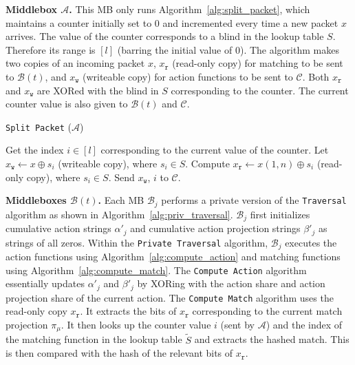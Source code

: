 \RequirePackage{fix-cm} \let\oldvec\vec \documentclass{sig-alternate-05-2015}
\newcommand{\descr}[1]{\smallskip \noindent \textbf{#1}}
\newcommand{\EMB}{\ensuremath{\mbox{$\mathcal{A}$}}}
\newcommand{\CMB}{\ensuremath{\mbox{$\mathcal{B}$}}}
\newcommand{\TMB}{\ensuremath{\mbox{$\mathcal{C}$}}}
\begin{document}
\descr{Middlebox \texorpdfstring{$\EMB$}{A)}.} 
This MB only runs Algorithm~\ref{alg:split_packet}, which maintains a counter initially set to $0$ and incremented every time a new packet $x$ arrives. The value of the counter corresponds to a blind in the lookup table $S$. Therefore its range is $[l]$ (barring the initial value of $0$). The algorithm makes two copies of an incoming packet $x$, $x_\mathtt{r}$ (read-only copy) for matching to be sent to $\CMB(t)$, and ${x}_\mathtt{w}$ (writeable copy) for action functions to be sent to $\TMB$. Both $x_\mathtt{r}$ and $x_\mathtt{w}$ are XORed with the blind in $S$ corresponding to the counter. The current counter value is also given to $\CMB(t)$ and $\TMB$. 

\begin{algorithm}[t] \caption{\texttt{Split Packet} ($\EMB$)}
\label{alg:split_packet}
\SetAlgoLined
{}
\SetAlCapSkip{1em}
\DontPrintSemicolon{}
\let\oldnl\nl \newcommand{\nonl}{\renewcommand{\nl}{\let\nl\oldnl}}
Get the index $i \in [l]$ corresponding to the current value of the counter.\;
Let $x_{\mathtt{w}} \leftarrow x \oplus s_i$ (writeable copy), where $s_i\in S$.\;
Compute $x_\mathtt{r} \leftarrow x(1, n) \oplus s_i$ (read-only copy), where $s_i \in S$. \;
\For{$j = 1$ \KwTo $t$}{
	Send $x_\mathtt{r}$, $i$ to $\CMB_j$.\;
}
Send $x_\mathtt{w}$, $i$ to $\TMB$.\;
\end{algorithm}

\descr{Middleboxes \texorpdfstring{$\CMB(t)$}{B(t)}.}
Each MB $\CMB_j$ performs a private version of the \texttt{Traversal} algorithm as shown in Algorithm~\ref{alg:priv_traversal}. $\CMB_j$ first initializes cumulative action strings $\alpha'_j$ and cumulative action projection strings $\beta'_j$ as strings of all zeros. Within the \texttt{Private Traversal} algorithm, $\CMB_j$ executes the action functions using Algorithm~\ref{alg:compute_action} and matching functions using Algorithm~\ref{alg:compute_match}. The \texttt{Compute Action} algorithm essentially updates $\alpha'_j$ and $\beta'_j$ by XORing with the action share and action projection share of the current action. The \texttt{Compute Match} algorithm uses the read-only copy $x_\mathtt{r}$. It extracts the bits of $x_\mathtt{r}$ corresponding to the current match projection $\pi_\mu$. It then looks up the counter value $i$ (sent by $\EMB$) and the index of the matching function in the lookup table $\tilde{S}$ and extracts the hashed match. This is then compared with the hash of the relevant bits of $x_\mathtt{r}$. 
\end{document}
